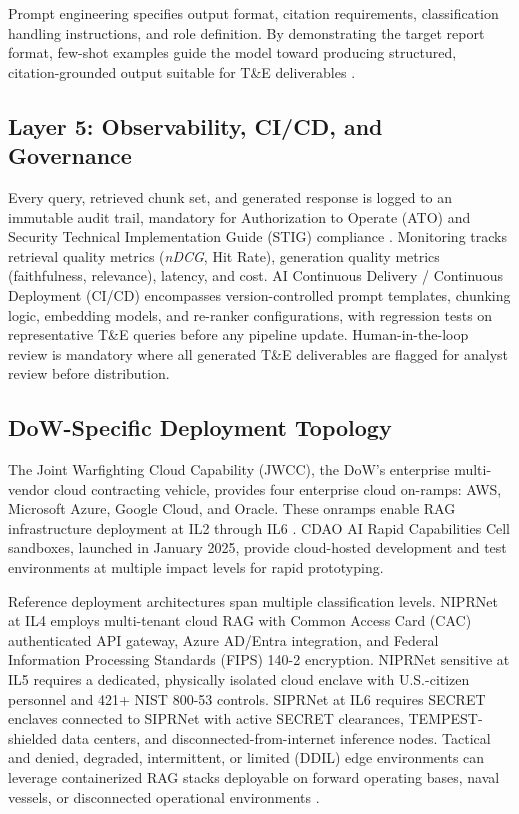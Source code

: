 \documentclass[12pt,letterpaper]{article}
\let\cite\parencite
\begin{document}
Prompt engineering specifies output format, citation requirements, classification handling instructions, and role definition. By demonstrating the target report format, few-shot examples guide the model toward producing structured, citation-grounded output suitable for T\&E deliverables \cite{liu2022,brown2020}.

\subsection{Layer 5: Observability, CI/CD, and Governance}

Every query, retrieved chunk set, and generated response is logged to an immutable audit trail, mandatory for Authorization to Operate (ATO) and Security Technical Implementation Guide (STIG) compliance \cite{cdao_rmf2024}. Monitoring tracks retrieval quality metrics (\textit{nDCG}, Hit Rate), generation quality metrics (faithfulness, relevance), latency, and cost. AI Continuous Delivery / Continuous Deployment (CI/CD) encompasses version-controlled prompt templates, chunking logic, embedding models, and re-ranker configurations, with regression tests on representative T\&E queries before any pipeline update. Human-in-the-loop review is mandatory where all generated T\&E deliverables are flagged for analyst review before distribution.

\subsection{DoW-Specific Deployment Topology}

The Joint Warfighting Cloud Capability (JWCC), the DoW's enterprise multi-vendor cloud contracting vehicle, provides four enterprise cloud on-ramps: AWS, Microsoft Azure, Google Cloud, and Oracle. These onramps enable RAG infrastructure deployment at IL2 through IL6 \cite{defensescoop2024}. CDAO AI Rapid Capabilities Cell sandboxes, launched in January 2025, provide cloud-hosted development and test environments at multiple impact levels for rapid prototyping.

Reference deployment architectures span multiple classification levels. NIPRNet at IL4 employs multi-tenant cloud RAG with Common Access Card (CAC) authenticated API gateway, Azure AD/Entra integration, and Federal Information Processing Standards (FIPS) 140-2 encryption. NIPRNet sensitive at IL5 requires a dedicated, physically isolated cloud enclave with U.S.-citizen personnel and 421+ NIST 800-53 controls. SIPRNet at IL6 requires SECRET enclaves connected to SIPRNet with active SECRET clearances, TEMPEST-shielded data centers, and disconnected-from-internet inference nodes. Tactical and denied, degraded, intermittent, or limited (DDIL) edge environments can leverage containerized RAG stacks deployable on forward operating bases, naval vessels, or disconnected operational environments \cite{asksage_dib2025}.
\end{document}
